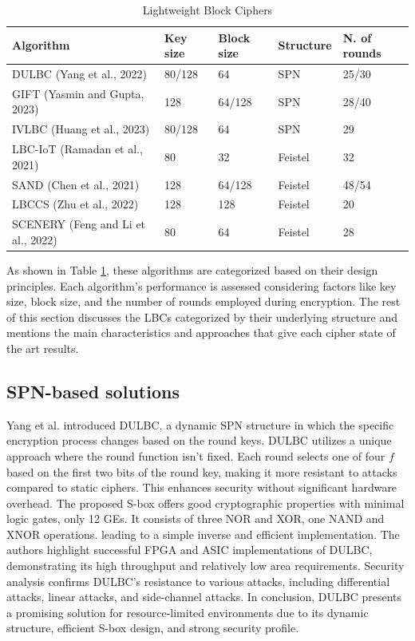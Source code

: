 \documentclass[conference]{IEEEtran}
\begin{document}
\begin{table}[ht]
    \centering
    \caption{Lightweight Block Ciphers}
    \begin{tabular}{lllll} 
     \toprule
     Algorithm & Key size & Block size & Structure & N. of rounds \\ 
     \midrule
     DULBC (Yang et al., 2022) \cite{DULBC} & 80/128 & 64 & SPN & 25/30 \\
     GIFT (Yasmin and Gupta, 2023)\cite{GIFT}\cite{yasmin2023modified} & 128 & 64/128 & SPN & 28/40 \\
     IVLBC (Huang et al., 2023)\cite{IVLBC} & 80/128 & 64 & SPN & 29 \\
     LBC-IoT (Ramadan et al., 2021)\cite{LBC-IoT} & 80 & 32 & Feistel & 32 \\
     SAND (Chen et al., 2021)\cite{SAND} & 128 & 64/128 & Feistel & 48/54 \\
     LBCCS (Zhu et al., 2022)\cite{LBCCS} & 128 & 128 & Feistel & 20 \\
     SCENERY (Feng and Li et al., 2022)\cite{SCENERY} & 80 & 64 & Feistel & 28  \\
     \bottomrule
    \end{tabular}
    \label{table:ciphers}
\end{table}

As shown in Table \ref{table:ciphers}, these algorithms are categorized based on their design principles. Each algorithm's performance is assessed considering factors like key size, block size, and the number of rounds employed during encryption. The rest of this section discusses the LBCs categorized by their underlying structure and mentions the main characteristics and approaches that give each cipher state of the art results.

\subsection{SPN-based solutions}

Yang et al. introduced DULBC, a dynamic SPN structure in which the specific encryption process changes based on the round keys. DULBC utilizes a unique approach where the round function isn't fixed. Each round selects one of four $f$ based on the first two bits of the round key, making it more resistant to attacks compared to static ciphers. This enhances security without significant hardware overhead. The proposed S-box offers good cryptographic properties with minimal logic gates, only 12 GEs. It consists of three NOR and XOR, one NAND and XNOR operations. leading to a simple inverse and efficient implementation. The authors highlight successful FPGA and ASIC implementations of DULBC, demonstrating its high throughput and relatively low area requirements. Security analysis confirms DULBC's resistance to various attacks, including differential attacks, linear attacks, and side-channel attacks. In conclusion, DULBC presents a promising solution for resource-limited environments due to its dynamic structure, efficient S-box design, and strong security profile.\cite{DULBC}
\end{document}
